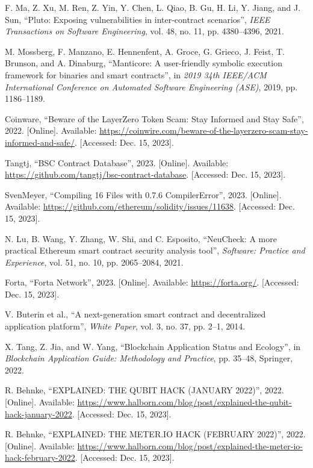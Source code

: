 \begin{thebibliography}{00}
 F. Ma, Z. Xu, M. Ren, Z. Yin, Y. Chen, L. Qiao, B. Gu, H. Li, Y. Jiang, and J. Sun, ``Pluto: Exposing vulnerabilities in inter-contract scenarios'', \textit{IEEE Transactions on Software Engineering}, vol. 48, no. 11, pp. 4380--4396, 2021.

 M. Mossberg, F. Manzano, E. Hennenfent, A. Groce, G. Grieco, J. Feist, T. Brunson, and A. Dinaburg, ``Manticore: A user-friendly symbolic execution framework for binaries and smart contracts'', in \textit{2019 34th IEEE/ACM International Conference on Automated Software Engineering (ASE)}, 2019, pp. 1186--1189.

 Coinware, ``Beware of the LayerZero Token Scam: Stay Informed and Stay Safe'', 2022. [Online]. Available: \url{https://coinwire.com/beware-of-the-layerzero-scam-stay-informed-and-safe/}. [Accessed: Dec. 15, 2023].

 Tangtj, ``BSC Contract Database'', 2023. [Online]. Available: \url{https://github.com/tangtj/bsc-contract-database}. [Accessed: Dec. 15, 2023].

 SvenMeyer, ``Compiling 16 Files with 0.7.6 CompilerError'', 2023. [Online]. Available: \url{https://github.com/ethereum/solidity/issues/11638}. [Accessed: Dec. 15, 2023].

 N. Lu, B. Wang, Y. Zhang, W. Shi, and C. Esposito, ``NeuCheck: A more practical Ethereum smart contract security analysis tool'', \textit{Software: Practice and Experience}, vol. 51, no. 10, pp. 2065--2084, 2021.

 Forta, ``Forta Network'', 2023. [Online]. Available: \url{https://forta.org/}. [Accessed: Dec. 15, 2023].

 V. Buterin et al., ``A next-generation smart contract and decentralized application platform'', \textit{White Paper}, vol. 3, no. 37, pp. 2--1, 2014.

 X. Tang, Z. Jia, and W. Yang, ``Blockchain Application Status and Ecology'', in \textit{Blockchain Application Guide: Methodology and Practice}, pp. 35--48, Springer, 2022.

 R. Behnke, ``EXPLAINED: THE QUBIT HACK (JANUARY 2022)'', 2022. [Online]. Available: \url{https://www.halborn.com/blog/post/explained-the-qubit-hack-january-2022}. [Accessed: Dec. 15, 2023].

 R. Behnke, ``EXPLAINED: THE METER.IO HACK (FEBRUARY 2022)'', 2022. [Online]. Available: \url{https://www.halborn.com/blog/post/explained-the-meter-io-hack-february-2022}. [Accessed: Dec. 15, 2023].


\end{thebibliography}
